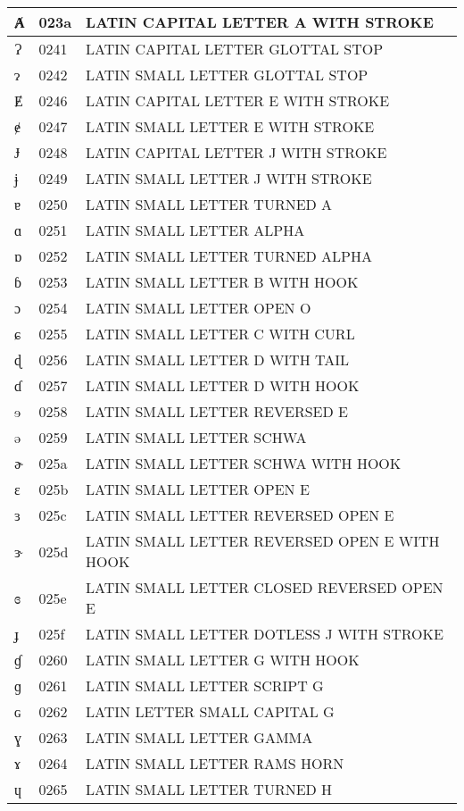 \documentclass[12pt,letterpaper,openany]{book}
\begin{document}
\begin{center}
\begin{supertabular}{|m{0.25in}|m{0.5in}|m{4in}|}
Ⱥ & 023a & LATIN CAPITAL LETTER A WITH STROKE\\\hline
Ɂ & 0241 & LATIN CAPITAL LETTER GLOTTAL STOP\\\hline
ɂ & 0242 & LATIN SMALL LETTER GLOTTAL STOP\\\hline
Ɇ & 0246 & LATIN CAPITAL LETTER E WITH STROKE\\\hline
ɇ & 0247 & LATIN SMALL LETTER E WITH STROKE\\\hline
Ɉ & 0248 & LATIN CAPITAL LETTER J WITH STROKE\\\hline
ɉ & 0249 & LATIN SMALL LETTER J WITH STROKE\\\hline
ɐ & 0250 & LATIN SMALL LETTER TURNED A\\\hline
ɑ & 0251 & LATIN SMALL LETTER ALPHA\\\hline
ɒ & 0252 & LATIN SMALL LETTER TURNED ALPHA\\\hline
ɓ & 0253 & LATIN SMALL LETTER B WITH HOOK\\\hline
ɔ & 0254 & LATIN SMALL LETTER OPEN O\\\hline
ɕ & 0255 & LATIN SMALL LETTER C WITH CURL\\\hline
ɖ & 0256 & LATIN SMALL LETTER D WITH TAIL\\\hline
ɗ & 0257 & LATIN SMALL LETTER D WITH HOOK\\\hline
ɘ & 0258 & LATIN SMALL LETTER REVERSED E\\\hline
ə & 0259 & LATIN SMALL LETTER SCHWA\\\hline
ɚ & 025a & LATIN SMALL LETTER SCHWA WITH HOOK\\\hline
ɛ & 025b & LATIN SMALL LETTER OPEN E\\\hline
ɜ & 025c & LATIN SMALL LETTER REVERSED OPEN E\\\hline
ɝ & 025d & LATIN SMALL LETTER REVERSED OPEN E WITH HOOK\\\hline
ɞ & 025e & LATIN SMALL LETTER CLOSED REVERSED OPEN E\\\hline
ɟ & 025f & LATIN SMALL LETTER DOTLESS J WITH STROKE\\\hline
ɠ & 0260 & LATIN SMALL LETTER G WITH HOOK\\\hline
ɡ & 0261 & LATIN SMALL LETTER SCRIPT G\\\hline
ɢ & 0262 & LATIN LETTER SMALL CAPITAL G\\\hline
ɣ & 0263 & LATIN SMALL LETTER GAMMA\\\hline
ɤ & 0264 & LATIN SMALL LETTER RAMS HORN\\\hline
ɥ & 0265 & LATIN SMALL LETTER TURNED H\\\hline

\end{supertabular}
\end{center}
\end{document}
